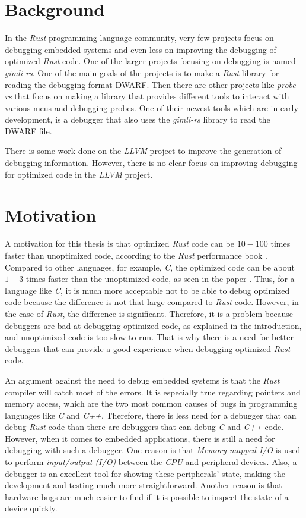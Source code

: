 \section{Background}
In the \emph{Rust} programming language community, very few projects focus on debugging embedded systems and even less on improving the debugging of optimized \emph{Rust} code.
One of the larger projects focusing on debugging is named \emph{gimli-rs}.
One of the main goals of the projects is to make a \emph{Rust} library for reading the debugging format \gls{DWARF}.
Then there are other projects like \emph{probe-rs} that focus on making a library that provides different tools to interact with various \glspl{mcu} and debugging probes.
One of their newest tools which are in early development, is a debugger that also uses the \emph{gimli-rs} library to read the DWARF file.


There is some work done on the \emph{LLVM} project to improve the generation of debugging information.
However, there is no clear focus on improving debugging for optimized code in the \emph{LLVM} project.


\section{Motivation}
A motivation for this thesis is that optimized \emph{Rust} code can be $10-100$ times faster than unoptimized code, according to the \emph{Rust} performance book \cite{perf-book}.
Compared to other languages, for example, \emph{C}, the optimized code can be about $1-3$ times faster than the unoptimized code, as seen in the paper \cite{clang-opt}.
Thus, for a language like \emph{C}, it is much more acceptable not to be able to debug optimized code because the difference is not that large compared to \emph{Rust} code.
However, in the case of \emph{Rust}, the difference is significant.
Therefore, it is a problem because debuggers are bad at debugging optimized code, as explained in the introduction, and unoptimized code is too slow to run.
That is why there is a need for better debuggers that can provide a good experience when debugging optimized \emph{Rust} code.


An argument against the need to debug embedded systems is that the \emph{Rust} compiler will catch most of the errors.
It is especially true regarding pointers and memory access, which are the two most common causes of bugs in programming languages like \emph{C} and \emph{C++}.
Therefore, there is less need for a debugger that can debug \emph{Rust} code than there are debuggers that can debug \emph{C} and \emph{C++} code.
However, when it comes to embedded applications, there is still a need for debugging with such a debugger.
One reason is that \emph{Memory-mapped I/O} is used to perform \emph{input/output (I/O)} between the \emph{CPU} and peripheral devices.
Also, a debugger is an excellent tool for showing these peripherals' state, making the development and testing much more straightforward.
Another reason is that hardware bugs are much easier to find if it is possible to inspect the state of a device quickly.



